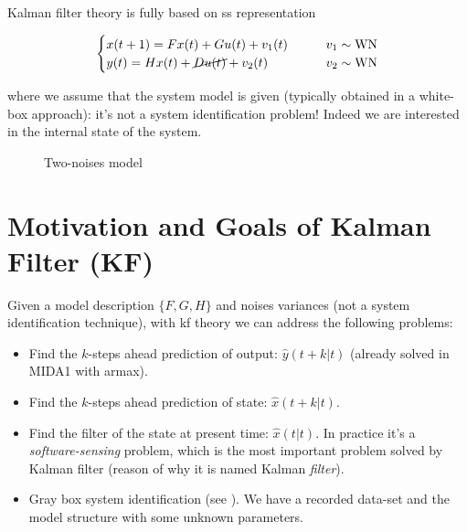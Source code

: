 Kalman filter theory is fully based on \acrfull{ss} representation

\[
    \begin{cases}
        x(t+1) = Fx(t) + Gu(t) + v_1(t)  & \qquad v_1 \sim \operatorname{WN} \\
        y(t) = Hx(t) + \cancel{Du(t)} + v_2(t) & \qquad v_2 \sim \operatorname{WN}
    \end{cases}
\]

where we assume that the system model is given (typically obtained in a white-box approach): it's not a system identification problem! Indeed we are interested in the internal state of the system.

\begin{figure}[H]
    \centering
    \caption*{Two-noises model}
\end{figure}


\section{Motivation and Goals of Kalman Filter (KF)}

Given a model description $\{F, G, H\}$ and noises variances (not a system identification technique), with \acrfull{kf} theory we can address the following problems:

\begin{itemize}
    \item Find the $k$-steps ahead prediction of output: $\hat{y}(t+k|t)$ (already solved in MIDA1 with \gls{armax}).
    \item Find the $k$-steps ahead prediction of state: $\hat{x}(t+k|t)$.
    \item Find the filter of the state at present time: $\hat{x}(t|t)$. In practice it's a \emph{software-sensing} problem, which is the most important problem solved by Kalman filter (reason of why it is named Kalman \emph{filter}).
    \item Gray box system identification (see ). We have a recorded data-set and the model structure with some unknown parameters.
\end{itemize}



